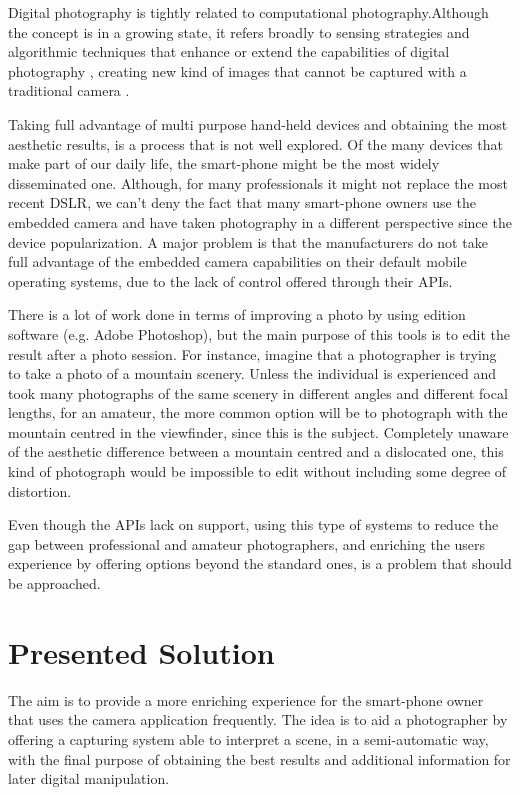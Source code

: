 Digital photography is tightly related to computational photography.Although the concept is in a growing state, it refers broadly to sensing strategies and algorithmic techniques that enhance or extend the capabilities of digital photography \cite{Szeliski2012} , creating new kind of images that cannot be captured with a traditional camera \cite{Pulli}. 

Taking full advantage of multi purpose hand-held devices and obtaining the most aesthetic results, is a process that is not well explored. 
Of the many devices that make part of our daily life, the smart-phone might be the most widely disseminated one. Although, for many professionals it might not replace the most recent DSLR, we can't deny the fact that many smart-phone owners use the embedded camera and have taken photography in a different perspective since the device popularization. A major problem is that the manufacturers do not take full advantage of the embedded camera capabilities on their default mobile operating systems, due to the lack of control offered through their APIs.

There is a lot of work done in terms of improving a photo by using edition software (e.g. Adobe Photoshop), but the main purpose of this tools is to edit the result after a photo session. For instance, imagine that a photographer is trying to take a photo of a mountain scenery. Unless the individual is experienced and took many photographs of the same scenery in different angles and different focal lengths, for an amateur, the more common option will be to photograph with the mountain centred in the viewfinder, since this is the subject. Completely unaware of the aesthetic difference between a mountain centred and a dislocated one, this kind of photograph would be impossible to edit without including some degree of distortion.

Even though the APIs lack on support, using this type of systems to reduce the gap between professional and amateur photographers, and enriching the users experience by offering options beyond the standard ones, is a problem that should be approached.

\section{Presented Solution}

The aim is to provide a more enriching experience for the smart-phone owner that uses the camera application frequently. The idea is to aid a photographer by offering a capturing system able to interpret a scene, in a semi-automatic way, with the final purpose of obtaining the best results and additional information for later digital manipulation.


